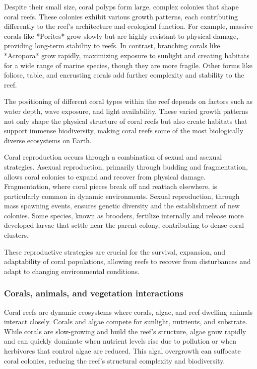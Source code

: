 Despite their small size, coral polyps form large, complex colonies that shape coral reefs. These colonies exhibit various growth patterns, each contributing differently to the reef's architecture and ecological function. For example, massive corals like *Porites* grow slowly but are highly resistant to physical damage, providing long-term stability to reefs. In contrast, branching corals like *Acropora* grow rapidly, maximizing exposure to sunlight and creating habitats for a wide range of marine species, though they are more fragile. Other forms like foliose, table, and encrusting corals add further complexity and stability to the reef.

The positioning of different coral types within the reef depends on factors such as water depth, wave exposure, and light availability. These varied growth patterns not only shape the physical structure of coral reefs but also create habitats that support immense biodiversity, making coral reefs some of the most biologically diverse ecosystems on Earth.


Coral reproduction occurs through a combination of sexual and asexual strategies. Asexual reproduction, primarily through budding and fragmentation, allows coral colonies to expand and recover from physical damage. Fragmentation, where coral pieces break off and reattach elsewhere, is particularly common in dynamic environments. Sexual reproduction, through mass spawning events, ensures genetic diversity and the establishment of new colonies. Some species, known as brooders, fertilize internally and release more developed larvae that settle near the parent colony, contributing to dense coral clusters.

These reproductive strategies are crucial for the survival, expansion, and adaptability of coral populations, allowing reefs to recover from disturbances and adapt to changing environmental conditions.

\subsubsection{Corals, animals, and vegetation interactions}

Coral reefs are dynamic ecosystems where corals, algae, and reef-dwelling animals interact closely. Corals and algae compete for sunlight, nutrients, and substrate. While corals are slow-growing and build the reef's structure, algae grow rapidly and can quickly dominate when nutrient levels rise due to pollution or when herbivores that control algae are reduced. This algal overgrowth can suffocate coral colonies, reducing the reef's structural complexity and biodiversity.

